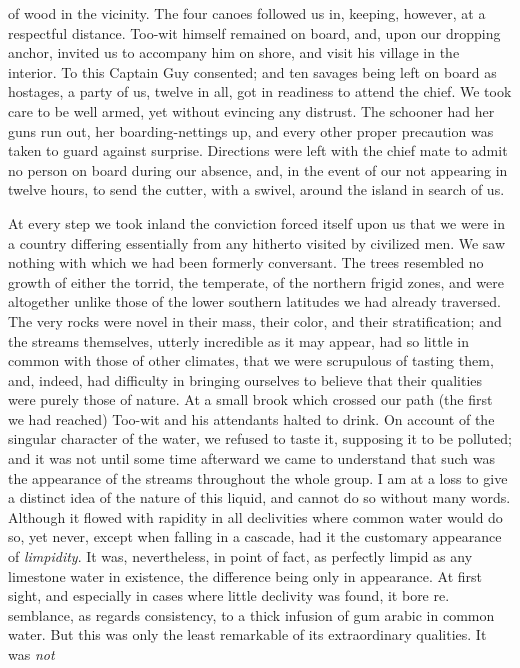 of wood in the vicinity. The four canoes followed us in, keeping, however, at a
respectful distance. Too-wit himself remained on board, and, upon our dropping
anchor, invited us to accompany him on shore, and visit his village in the
interior. To this Captain Guy consented; and ten savages being left on board as
hostages, a party of us, twelve in all, got in readiness to attend the chief. We
took care to be well armed, yet without evincing any distrust. The schooner had
her guns run out, her boarding-nettings up, and every other proper precaution
was taken to guard against surprise. Directions were left with the chief mate to
admit no person on board during our absence, and, in the event of our not
appearing in twelve hours, to send the cutter, with a swivel, around the island
in search of us. 

At every step we took inland the conviction forced itself upon us that we
were in a country differing essentially from any hitherto visited by civilized
men. We saw nothing with which we had been formerly conversant. The trees
resembled no growth of either the torrid, the temperate, of the northern frigid
zones, and were altogether unlike those of the lower southern latitudes we had
already traversed. The very rocks were novel in their mass, their color, and
their stratification; and the streams themselves, utterly incredible as it may
appear, had so little in common with those of other climates, that we were
scrupulous of tasting them, and, indeed, had difficulty in bringing ourselves to
believe that their qualities were purely those of nature. At a small brook which
crossed our path (the first we had reached) Too-wit and his attendants halted to
drink. On account of the singular character of the water, we refused to taste
it, supposing it to be polluted; and it was not until some time afterward we
came to understand that such was the appearance of the streams throughout the
whole group. I am at a loss to give a distinct idea of the nature of this
liquid, and cannot do so without many words. Although it flowed with rapidity in
all declivities where common water would do so, yet never, except when falling
in a cascade, had it the customary appearance of \emph{limpidity}. It was,
nevertheless, in point of fact, as perfectly limpid as any limestone water in
existence, the difference being only in appearance. At first sight, and
especially in cases where little declivity was found, it bore re. semblance, as
regards consistency, to a thick infusion of gum arabic in common water. But this
was only the least remarkable of its extraordinary qualities. It was \emph{not}
